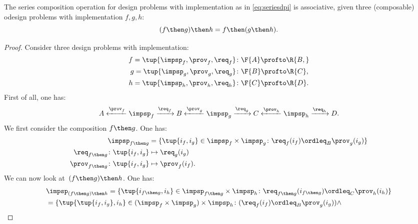 \begin{lemma}
  The series composition operation for design problems with implementation as in \cref{eq:seriesdpi} is associative, \ie  given three (composable) odesign problems with implementation $f,g,h$:
  \begin{equation}
  (f\then g)
    \then h = f\then (g\then h).
  \end{equation}
\end{lemma}
\begin{proof}
  Consider three design problems with implementation:
  \begin{equation}
    \begin{aligned}
      f=\tup{{\impsp_f, \prov_f, \req_f} }&\colon \F{A} \profto\R{B,}\\
      g=\tup{\impsp_g, \prov_g, \req_g}&\colon \F{B} \profto \R{C},\\
      h=\tup{\impsp_h, \prov_h, \req_h}&\colon \F{C} \profto \R{D}.
    \end{aligned}
  \end{equation}
  First of all, one has:
  \begin{equation}
    A \xleftarrow{\prov_f} \impsp_f \xrightarrow{\req_f} B
    \xleftarrow{\prov_g} \impsp_g \xrightarrow{\req_g} C
    \xleftarrow{\prov_h} \impsp_h \xrightarrow{\req_h} D.
  \end{equation}
  We first consider the composition $f\then g$. One has:
  \begin{equation}
    \begin{aligned}
      \impsp_{f\then g} &= \{
      \tup{i_f,i_g} \in \impsp_f \times \impsp_g \colon
      \req_f(i_f) \ordleq_{B} \prov_g(i_g)
      \}\\
      \req_{f\then g}  \colon  \tup{i_f,i_g} &\mapsto \req_g(i_g) \\
      \prov_{f\then g}  \colon  \tup{i_f,i_g} &\mapsto \prov_f(i_f).
    \end{aligned}
  \end{equation}
  We can now look at~$(f\then g)\then h$. One has:
  \begin{equation}
    \begin{aligned}
      &\impsp_{(f\then g)\then h} = \{
      \tup{i_{f\then g},i_h} \in \impsp_{f\then g} \times \impsp_{h}\colon
      \req_{f\then g}(i_{f\then g}) \ordleq_{C} \prov_h(i_h)
      \}\\
      &=\{
      \tup{\tup{i_f, i_g},i_h} \in (\impsp_f \times \impsp_g) \times \impsp_{h}\colon
      (\req_f(i_f) \ordleq_{B} \prov_g(i_g))
      \wedge

\end{aligned}
\end{equation}
\end{proof}

